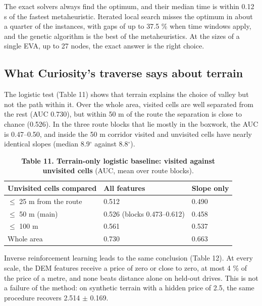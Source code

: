 \documentclass[11pt,a4paper]{article}
\begin{document}
The exact solvers always find the optimum, and their median time is within 0.12 s of the fastest metaheuristic. Iterated local search misses the optimum in about a quarter of the instances, with gaps of up to 37.5 \% when time windows apply, and the genetic algorithm is the best of the metaheuristics. At the sizes of a single EVA, up to 27 nodes, the exact answer is the right choice.

\subsection{What Curiosity's traverse says about terrain}

The logistic test (Table 11) shows that terrain explains the choice of valley but not the path within it. Over the whole area, visited cells are well separated from the rest (AUC 0.730), but within 50 m of the route the separation is close to chance (0.526). In the three route blocks that lie mostly in the boxwork, the AUC is 0.47--0.50, and inside the 50 m corridor visited and unvisited cells have nearly identical slopes (median 8.9$^\circ$ against 8.8$^\circ$).

\begin{table}[H]
\centering\small
\caption{\textbf{Table 11. Terrain-only logistic baseline: visited against unvisited cells} (AUC, mean over route blocks).}
\begin{tabular}{lll}
\toprule
Unvisited cells compared & All features & Slope only \\
\midrule
$\le$ 25 m from the route & 0.512 & 0.490 \\
$\le$ 50 m (main) & 0.526 (blocks 0.473--0.612) & 0.458 \\
$\le$ 100 m & 0.561 & 0.537 \\
Whole area & 0.730 & 0.663 \\
\bottomrule
\end{tabular}
\end{table}

Inverse reinforcement learning leads to the same conclusion (Table 12). At every scale, the DEM features receive a price of zero or close to zero, at most 4 \% of the price of a metre, and none beats distance alone on held-out drives. This is not a failure of the method: on synthetic terrain with a hidden price of 2.5, the same procedure recovers 2.514 $\pm$ 0.169.
\end{document}
